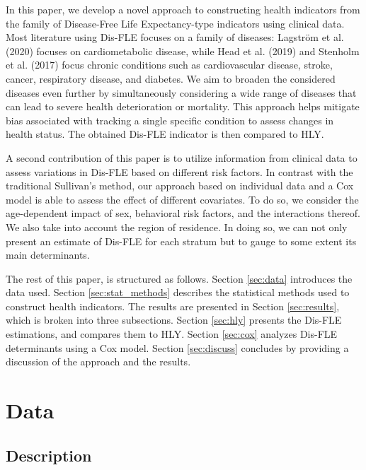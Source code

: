 \documentclass{article}
\begin{document}
In this paper, we develop a novel approach to constructing health
indicators from the family of Disease-Free Life Expectancy-type
indicators using clinical data. Most literature using Dis-FLE focuses on
a family of diseases: Lagström et al. (2020) focuses on cardiometabolic
disease, while Head et al. (2019) and Stenholm et al. (2017) focus
chronic conditions such as cardiovascular disease, stroke, cancer,
respiratory disease, and diabetes. We aim to broaden the considered
diseases even further by simultaneously considering a wide range of
diseases that can lead to severe health deterioration or mortality. This
approach helps mitigate bias associated with tracking a single specific
condition to assess changes in health status. The obtained Dis-FLE
indicator is then compared to HLY.

A second contribution of this paper is to utilize information from
clinical data to assess variations in Dis-FLE based on different risk
factors. In contrast with the traditional Sullivan's method, our
approach based on individual data and a Cox model is able to assess the
effect of different covariates. To do so, we consider the age-dependent
impact of sex, behavioral risk factors, and the interactions thereof. We
also take into account the region of residence. In doing so, we can not
only present an estimate of Dis-FLE for each stratum but to gauge to
some extent its main determinants.

The rest of this paper, is structured as follows. Section \ref{sec:data}
introduces the data used. Section \ref{sec:stat_methods} describes the
statistical methods used to construct health indicators. The results are
presented in Section \ref{sec:results}, which is broken into three
subsections. Section \ref{sec:hly} presents the Dis-FLE estimations, and
compares them to HLY. Section \ref{sec:cox} analyzes Dis-FLE
determinants using a Cox model. Section \ref{sec:discuss} concludes by
providing a discussion of the approach and the results.

\hypertarget{data}{%
\section{\texorpdfstring{Data \label{sec:data}}{Data }}\label{data}}

\hypertarget{description}{%
\subsection{Description}\label{description}}
\end{document}
